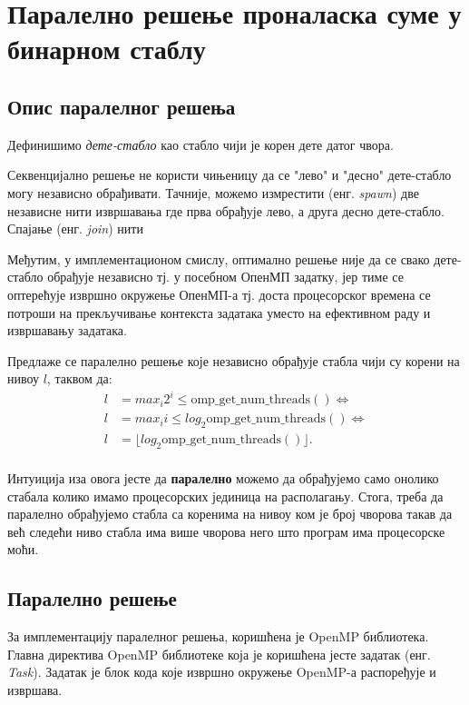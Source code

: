 \section{Паралелно решење проналаска суме у бинарном стаблу}

\subsection{Опис паралелног решења}
Дефинишимо \textit{дете-стабло} као стабло чији је корен дете датог чвора.

Секвенцијално решење не користи чињеницу да се "лево" и "десно" дете-стабло могу независно обрађивати.
Тачније, можемо измрестити (енг. \textit{spawn}) две независне нити извршавања где прва обрађује лево, а друга десно дете-стабло.
Спајање (енг. \textit{join}) нити 

Међутим, у имплементационом смислу, оптимално решење није да се свако дете-стабло обрађује независно тј.
у посебном ОпенМП задатку, јер тиме се оптерећује извршно окружење ОпенМП-а тј. доста процесорског времена
се потроши на прекључивање контекста задатака уместо на ефективном раду и извршавању задатака.

Предлаже се паралелно решење које независно обрађује стабла чији су корени на нивоу $l$, таквом да:
\begin{equation}
\begin{split}
    l &= max_i 2^i \leq \mathrm{omp\_get\_num\_threads()} \iff \\
    l &= max_i i \leq log_2 \mathrm{omp\_get\_num\_threads()} \iff \\
    l &= \lfloor log_2 \mathrm{omp\_get\_num\_threads()} \rfloor .\\
\end{split}
\end{equation}

Интуиција иза овога јесте да \textbf{паралелно} можемо да обрађујемо само онолико стабала колико имамо процесорских јединица на располагању.
Стога, треба да паралелно обрађујемо стабла са коренима на нивоу ком је број чворова такав да већ следећи ниво стабла има више чворова него
што програм има процесорске моћи.

\subsection{Паралелно решење}

За имплементацију паралелног решења, коришћена је OpenMP библиотека.
Главна директива OpenMP библиотеке која је коришћена јесте задатак (енг. \textit{Task}).
Задатак је блок кода које извршно окружење OpenMP-а распоређује и извршава.

